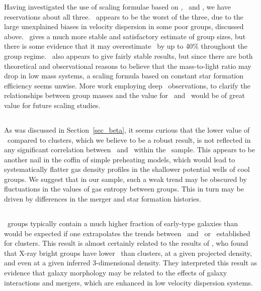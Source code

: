 \documentclass[usenatbib]{mn2e}
\begin{document}
Having investigated the use of scaling formulae based on \sigmav, \TX\ and \LB,
we have reservations about all three. \sigmav\ appears to be the worst of the
three, due to the large unexplained biases in velocity dispersion in some poor
groups, discussed above.  \TX\ gives a much more stable and satisfactory estimate
of group sizes, but there is some evidence that it may overestimate \rfh\ by up
to 40\% throughout the group regime.  \LB\ also appears to give fairly stable
results, but since there are both theoretical and observational reasons to
believe that the mass-to-light ratio may drop in low mass systems, a scaling
formula based on constant star formation efficiency seems unwise.  More work
employing deep \XMM\ observations, to clarify the relationships between group
masses and the value for \TX\ and \LB\ would be of great value for future
scaling studies.


\subsection{\betafit}

As was discussed in Section~\ref{sec_beta}, it seems curious that the lower value
of \betafit\ compared to clusters, which we believe to be a robust result, is not
reflected in any significant correlation between \betafit\ and \TX\ within the
\GEMS\ sample.  This appears to be another nail in the coffin of simple preheating
models, which would lead to systematically flatter gas density profiles in the
shallower potential wells of cool groups.  We suggest that in our sample, such a
weak trend may be obscured by fluctuations in the values of gas entropy between
groups.  This in turn may be driven by differences in the merger and star
formation histories.


\subsection{\fsp}

\GEMS\ groups typically contain a much higher fraction of early-type galaxies than
would be expected if one extrapolates the trends between \fsp\ and \TX\ or \LX\
established for clusters.  This result is almost certainly related to the results
of \citet{helsdon03b}, who found that X-ray bright groups have lower \fsp\ than
clusters, at a given projected density, and even at a given inferred
3-dimensional density.  They interpreted this result as evidence that galaxy
morphology may be related to the effects of galaxy interactions and mergers,
which are enhanced in low velocity dispersion systems.
\end{document}
